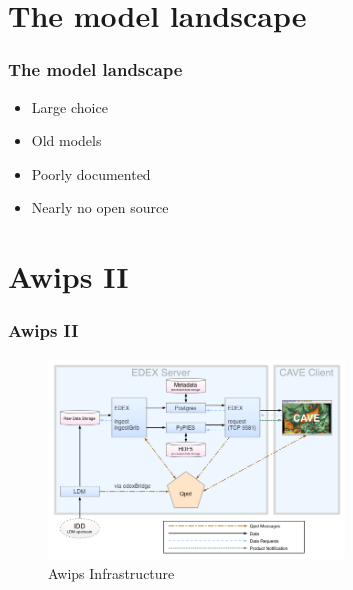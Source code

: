 \documentclass[compress]{beamer}
\begin{document}
\section{The model landscape}
\begin{frame}
    \frametitle{The model landscape}
    
		\begin{itemize}
		    \item Large choice
			\item Old models
			\item Poorly documented
			\item Nearly no open source
		\end{itemize}

\end{frame}

\section{Awips II}
\begin{frame}
    \frametitle{Awips II}
    \begin{center}
    	\begin{figure}
			\includegraphics[width=0.7\textwidth]{gfx/awipsII.png}
      	  	\caption[]{Awips Infrastructure \cite{Uni01}}
		\end{figure}
	\end{center}
    
\end{frame}
\end{document}
